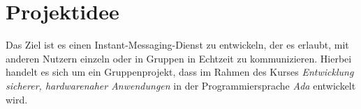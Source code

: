 \documentclass[12pt,a4paper,bibliography=totocnumbered,listof=totocnumbered]{scrartcl}
\begin{document}
\pagebreak

\renewcommand{\cfttabpresnum}{Tab. }
\renewcommand{\cftfigpresnum}{Abb. }
\settowidth{\cfttabnumwidth}{Abb. 10\quad}
\settowidth{\cftfignumwidth}{Abb. 10\quad}

\singlespacing
{}
\renewcommand{\contentsname}{Inhaltsverzeichnis}
\tableofcontents
\pagebreak



\renewcommand{\sectionmark}[1]{\markright{#1}}
\renewcommand{\subsectionmark}[1]{}
\renewcommand{\subsubsectionmark}[1]{}
\rhead{\rightmark}

\onehalfspacing
\renewcommand{\thesection}{\arabic{section}}
\renewcommand{\theHsection}{\arabic{section}}
\setcounter{section}{0}

\section{Projektidee}
Das Ziel ist es einen Instant-Messaging-Dienst zu entwickeln, der es erlaubt, mit anderen Nutzern einzeln oder in Gruppen in Echtzeit zu kommunizieren. Hierbei handelt es sich um ein Gruppenprojekt, dass im Rahmen des Kurses \textit{Entwicklung sicherer, hardwarenaher Anwendungen} in der Programmiersprache \textit{Ada} entwickelt wird.  
\end{document}
